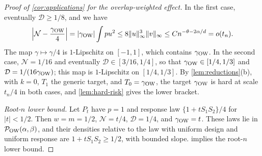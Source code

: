\begin{proof}[Proof of \cref{cor:applications} for the overlap-weighted effect]
In the first case, eventually $\mathcal D\ge1/8$, and we have
\[
 \Bigl|\mathcal N-\frac{\gamma_{\rm OW}}4\Bigr|
 =|\gamma_{\rm OW}|\int pu^2
 \le8\|u\|_\infty^3\|v\|_\infty
 \le Cn^{-\theta-2\alpha/d}=o(t_n).
\]
The map $\gamma\mapsto\gamma/4$ is $1$-Lipschitz on $[-1,1]$, which
contains $\gamma_{\rm OW}$. In the second case, $\mathcal N=1/16$ and
eventually $\mathcal D\in[3/16,1/4]$, so that
$\gamma_{\rm OW}\in[1/4,1/3]$ and $\mathcal D=1/(16\gamma_{\rm OW})$;
this map is $1$-Lipschitz on $[1/4,1/3]$.
By \cref{lem:reductions}(b), with $k=0$, $T_1$ the generic target,
and $T_0=\gamma_{\rm OW}$, the target $\gamma_{\rm OW}$ is hard at
scale $t_n/4$ in both cases, and \cref{lem:hard-risk} gives the lower
bracket.

\emph{Root-$n$ lower bound.} Let $P_t$ have $p=1$ and response law
$\{1+tS_1S_2\}/4$ for $|t|<1/2$. Then $w=m=1/2$,
$\mathcal N=t/4$, $\mathcal D=1/4$, and $\gamma_{\rm OW}=t$.
These laws lie in $\mathcal P_{\rm OW}(\alpha,\beta)$, and their densities
relative to the law with uniform design and uniform response are
$1+tS_1S_2\ge1/2$, with bounded slope.
 implies the root-$n$ lower bound.
\end{proof}
